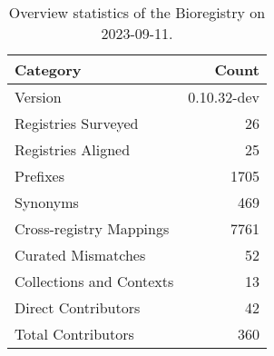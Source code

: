 \begin{table}
\caption{Overview statistics of the Bioregistry on 2023-09-11.}
\label{tab:bioregistry-summary}
\begin{tabular}{lr}
\toprule
Category & Count \\
\midrule
Version & 0.10.32-dev \\
Registries Surveyed & 26 \\
Registries Aligned & 25 \\
Prefixes & 1705 \\
Synonyms & 469 \\
Cross-registry Mappings & 7761 \\
Curated Mismatches & 52 \\
Collections and Contexts & 13 \\
Direct Contributors & 42 \\
Total Contributors & 360 \\
\bottomrule
\end{tabular}
\end{table}
